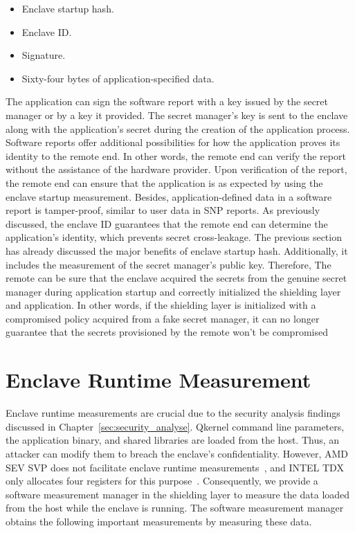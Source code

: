 \begin{itemize}
    \item Enclave startup hash.
    \item Enclave ID.
    \item Signature.
    \item Sixty-four bytes of application-specified data.
\end{itemize}

The application can sign the software report with a key issued by the secret manager or by a key it provided. The secret manager's key is sent to the enclave along with the application's secret during the creation of the application process. Software reports offer additional possibilities 
for how the application proves its identity to the remote end. In other words, the remote end can verify the report without the assistance of the hardware provider. Upon verification of the report, the remote end can ensure that the application is as expected by using the enclave startup 
measurement. Besides, application-defined data in a software report is tamper-proof, similar to user data in SNP reports. As previously discussed, the enclave ID guarantees that the remote end can determine the application's identity, which prevents secret cross-leakage. The previous 
section has already discussed the major benefits of enclave startup hash. Additionally, it includes the measurement of the secret manager's public key. Therefore, The remote can be sure that the enclave acquired the secrets from the genuine secret manager during application startup and 
correctly initialized the shielding layer and application. In other words, if the shielding layer is initialized with a compromised policy acquired from a fake secret manager, it can no longer guarantee that the secrets provisioned by the remote won't be compromised




\section{Enclave Runtime Measurement}
\label{sec:Enclave_Runtime_Measurement}
Enclave runtime measurements are crucial due to the security analysis findings discussed in Chapter~\ref{sec:security_analyse}. Qkernel command line parameters, the application binary, and shared libraries are loaded from the host. Thus, an attacker can modify them 
to breach the enclave's confidentiality. However, AMD SEV SVP does not facilitate enclave runtime measurements~\cite*{snp_firmware}, and INTEL TDX only allocates four registers for this purpose~\cite*{Intel_tdx_whitepaper}. Consequently, we provide a software measurement manager in the shielding 
layer to measure the data loaded from the host while the enclave is running. The software measurement manager obtains the following important measurements by measuring these data.

